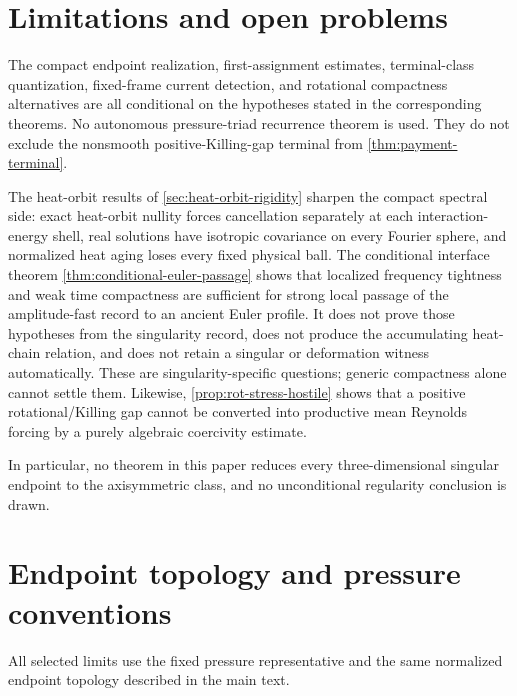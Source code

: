 \documentclass[11pt]{article}
\theoremstyle{definition}\newtheorem{problem}[theorem]{Problem}
\theoremstyle{definition}
\theoremstyle{remark}
\begin{document}
\section{Limitations and open problems}
The compact endpoint realization, first-assignment estimates, terminal-class quantization, fixed-frame current detection, and rotational compactness alternatives are all conditional on the hypotheses stated in the corresponding theorems.  No autonomous pressure-triad recurrence theorem is used.  They do not exclude the nonsmooth positive-Killing-gap terminal from \cref{thm:payment-terminal}.

The heat-orbit results of \cref{sec:heat-orbit-rigidity} sharpen the compact spectral side: exact heat-orbit nullity forces cancellation separately at each interaction-energy shell, real solutions have isotropic covariance on every Fourier sphere, and normalized heat aging loses every fixed physical ball.  The conditional interface theorem \cref{thm:conditional-euler-passage} shows that localized frequency tightness and weak time compactness are sufficient for strong local passage of the amplitude-fast record to an ancient Euler profile.  It does not prove those hypotheses from the singularity record, does not produce the accumulating heat-chain relation, and does not retain a singular or deformation witness automatically.  These are singularity-specific questions; generic compactness alone cannot settle them.  Likewise, \cref{prop:rot-stress-hostile} shows that a positive rotational/Killing gap cannot be converted into productive mean Reynolds forcing by a purely algebraic coercivity estimate.

In particular, no theorem in this paper reduces every three-dimensional singular endpoint to the axisymmetric class, and no unconditional regularity conclusion is drawn.

\appendix
\section{Endpoint topology and pressure conventions}
All selected limits use the fixed pressure representative and the same normalized endpoint topology described in the main text.
\end{document}
